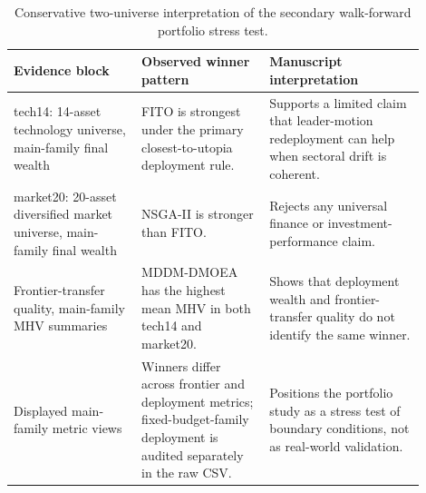 \begin{table}[!t]
\centering
\small
\caption{Conservative two-universe interpretation of the secondary walk-forward portfolio stress test.}
\label{tab:portfolio-scope}
\begin{tabular}{L{0.28\linewidth}L{0.28\linewidth}L{0.34\linewidth}}
\toprule
Evidence block & Observed winner pattern & Manuscript interpretation \\
\midrule
tech14: 14-asset technology universe, main-family final wealth & FITO is strongest under the primary closest-to-utopia deployment rule. & Supports a limited claim that leader-motion redeployment can help when sectoral drift is coherent. \\
market20: 20-asset diversified market universe, main-family final wealth & NSGA-II is stronger than FITO. & Rejects any universal finance or investment-performance claim. \\
Frontier-transfer quality, main-family MHV summaries & MDDM-DMOEA has the highest mean MHV in both tech14 and market20. & Shows that deployment wealth and frontier-transfer quality do not identify the same winner. \\
Displayed main-family metric views & Winners differ across frontier and deployment metrics; fixed-budget-family deployment is audited separately in the raw CSV. & Positions the portfolio study as a stress test of boundary conditions, not as real-world validation. \\
\bottomrule
\end{tabular}
\end{table}
